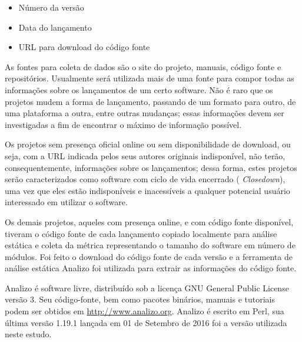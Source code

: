 \begin{itemize}
  \item Número da versão
  \item Data do lançamento
  \item URL para download do código fonte
\end{itemize}

As fontes para coleta de dados são o site do projeto, manuais, código fonte e
repositórios. Usualmente será utilizada mais de uma fonte para compor todas as
informações sobre os lançamentos de um certo software. Não é raro que os
projetos mudem a forma de lançamento, passando de um formato para outro, de uma
plataforma a outra, entre outras mudanças; essas informações devem ser
investigadas a fim de encontrar o máximo de informação possível.


Os projetos sem presença oficial online ou sem disponibilidade de download, ou
seja, com a URL indicada pelos seus autores originais indisponível,
não terão, consequentemente, informações sobre os lançamentos; dessa forma, estes
projetos serão caracterizados como software com ciclo de vida encerrado ({\it
Closedown}), uma vez que eles estão indisponíveis e inacessíveis a qualquer
potencial usuário interessado em utilizar o software.


Os demais projetos, aqueles com presença online, e com código fonte disponível,
tiveram o código fonte de cada lançamento copiado localmente para análise
estática e coleta da métrica representando o tamanho do software em número de
módulos. Foi feito o download do código fonte de cada versão e a ferramenta de
análise estática Analizo foi utilizada para extrair as informações do código
fonte.

Analizo é software livre, distribuído sob a licença GNU General Public License
versão 3. Seu código-fonte, bem como pacotes binários, manuais e tutoriais
podem ser obtidos em \url{http://www.analizo.org}. Analizo é escrito em Perl,
sua última versão 1.19.1 lançada em 01 de Setembro de 2016 foi a versão
utilizada neste estudo.

